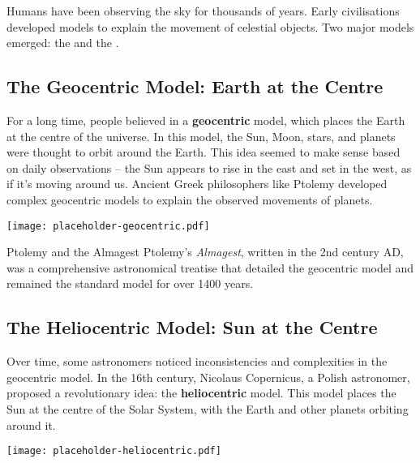 \FloatBarrier
\1

Humans have been observing the sky for thousands of years.  Early civilisations developed models to explain the movement of celestial objects.  Two major models emerged: the  and the .

\subsection{The Geocentric Model: Earth at the Centre}

For a long time, people believed in a \textbf{geocentric} model, which places the Earth at the centre of the universe.  In this model, the Sun, Moon, stars, and planets were thought to orbit around the Earth.  This idea seemed to make sense based on daily observations – the Sun appears to rise in the east and set in the west, as if it's moving around us.  Ancient Greek philosophers like Ptolemy developed complex geocentric models to explain the observed movements of planets.

\begin{marginfigure}
\texttt{[image: placeholder-geocentric.pdf]}
\caption{\label{fig:geocentric}A simplified diagram of the geocentric model. \textit{Image to be added.}}
\end{marginfigure}

\begin{historylink}{Ptolemy and the Almagest}
Ptolemy's \textit{Almagest}, written in the 2nd century AD, was a comprehensive astronomical treatise that detailed the geocentric model and remained the standard model for over 1400 years.
\end{historylink}


\subsection{The Heliocentric Model: Sun at the Centre}

Over time, some astronomers noticed inconsistencies and complexities in the geocentric model. In the 16th century, Nicolaus Copernicus, a Polish astronomer, proposed a revolutionary idea: the \textbf{heliocentric} model. This model places the Sun at the centre of the Solar System, with the Earth and other planets orbiting around it.

\begin{marginfigure}
\texttt{[image: placeholder-heliocentric.pdf]}
\caption{\label{fig:heliocentric}A simplified diagram of the heliocentric model. \textit{Image to be added.}}
\end{marginfigure}

